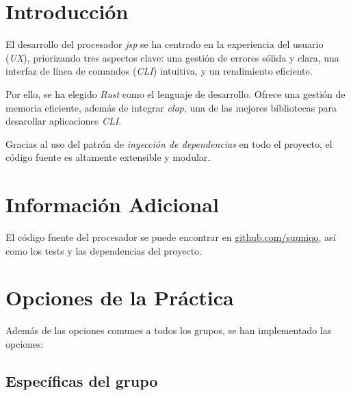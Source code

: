 \documentclass[a4paper]{CSMakotoTechnicalReport}
\begin{document}
\begin{multicols}{2} %


    \tableofcontents


    \section{Introducción}

    El desarrollo del procesador \textit{jsp} se ha centrado en la experiencia del usuario (\textit{UX}), priorizando tres aspectos clave: una gestión de errores sólida y clara, una interfaz de línea de comandos (\textit{CLI}) intuitiva, y un rendimiento eficiente.

    Por ello, se ha elegido \textit{Rust} como el lenguaje de desarrollo. Ofrece una gestión de memoria eficiente, además de integrar \textit{clap}, una de las mejores bibliotecas para desarollar aplicaciones \textit{CLI}.

    Gracias al uso del patrón de \textit{inyección de dependencias} en todo el proyecto, el código fuente es altamente extensible y modular.

    \section{Información Adicional}

    El código fuente del procesador se puede encontrar en \href{https://www.github.com/suuniqo}{github.com/suuniqo}, así como los tests y las dependencias del proyecto.

    \section{Opciones de la Práctica}

    Además de las opciones comunes a todos los grupos, se han implementado las opciones:

    \subsection{Específicas del grupo}


\end{multicols}
\end{document}
